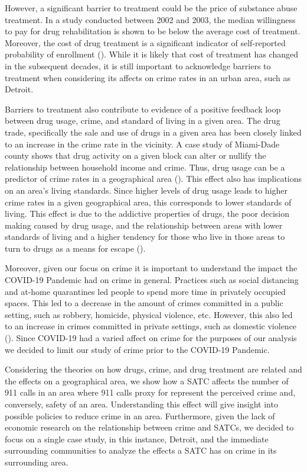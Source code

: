\documentclass[12pt]{article}
\begin{document}
However, a significant barrier to treatment could be the price of substance abuse treatment. In a study conducted between 2002 and 2003, the median willingness to pay for drug rehabilitation is shown to be below the average cost of treatment. Moreover, the cost of drug treatment is a significant indicator of self-reported probability of enrollment (\cite{cost_of_drug_treatment}). While it is likely that cost of treatment has changed in the subsequent decades, it is still important to acknowledge barriers to treatment when considering its affects on crime rates in an urban area, such as Detroit. 

Barriers to  treatment also contribute to evidence of a positive feedback loop between drug usage, crime, and standard of living in a given area. The drug trade, specifically the sale and use of drugs in a given area has been closely linked to an increase in the crime rate in the vicinity. A case study of Miami-Dade county shows that drug activity on a given block can alter or nullify the relationship between household income and crime. Thus, drug usage can be a predictor of crime rates in a geographical area (\cite{drugs_crime_space_time}). This effect also has implications on an area's living standards. Since higher levels of drug usage leads to higher crime rates in a given geographical area, this corresponds to lower standards of living. This effect is due to the addictive properties of drugs, the poor decision making caused by drug usage, and the relationship between areas with lower standards of living and a higher tendency for those who live in those areas to turn to drugs as a means for escape (\cite{drugs_and_crime}).

Moreover, given our focus on crime it is important to understand the impact the COVID-19 Pandemic had on crime in general. Practices such as social distancing and at-home quarantines led people to spend more time in privately occupied spaces. This led to a decrease in the amount of crimes committed in a public setting, such as robbery, homicide, physical violence, etc. However, this also led to an increase in crimes committed in private settings, such as domestic violence (\cite{covid_and_crime}). Since COVID-19 had a varied affect on crime for the purposes of our analysis we decided to limit our study of crime prior to the COVID-19 Pandemic.

Considering the theories on how drugs, crime, and drug treatment are related and the effects on a geographical area, we show how a SATC affects the number of 911 calls in an area where 911 calls proxy for represent the perceived crime and, conversely, safety of an area. Understanding this effect will give insight into possible policies to reduce crime in an area. Furthermore, given the lack of economic research on the relationship between crime and SATCs, we decided to focus on a single case study, in this instance, Detroit, and the immediate surrounding communities to analyze the effects a SATC has on crime in its surrounding area. 
\end{document}
